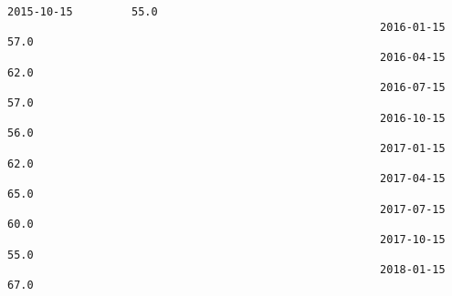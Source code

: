 \documentclass[11pt]{article}
\begin{document}
\begin{Verbatim}[commandchars=\\\{\}]
                                                         2015-10-15         55.0   
                                                         2016-01-15         57.0   
                                                         2016-04-15         62.0   
                                                         2016-07-15         57.0   
                                                         2016-10-15         56.0   
                                                         2017-01-15         62.0   
                                                         2017-04-15         65.0   
                                                         2017-07-15         60.0   
                                                         2017-10-15         55.0   
                                                         2018-01-15         67.0   
        

\end{Verbatim}
\end{document}
